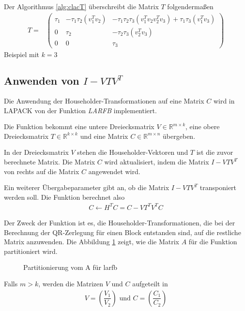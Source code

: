 Der Algorithmus \ref{alg:clacT} überschreibt die Matrix $T$ folgendermaßen
\begin{align*}
T =&
\begin{pmatrix}
\tau_1 & -\tau_1 \tau_2 (v_1^T v_2 ) & - \tau_1 \tau_2  \tau_3 (v_1^T v_2 v_2^T v_3) + \tau_1 \tau_3  (v_1^T v_3)\\ 
0 & \tau_2 &  -\tau_2 \tau_3  (v_2^T v_3)\\
0 & 0 & \tau_3
\end{pmatrix}
\end{align*}
Beispiel mit $k=3$

\subsection{Anwenden von $I - VTV^T$} \label{applyT}
Die Anwendung der Householder-Transformationen auf eine Matrix $C$ wird in LAPACK von der  Funktion \textit{LARFB} implementiert.

Die Funktion bekommt eine untere Dreiecksmatrix $V \in \mathbb{R}^{m \times k}$, eine obere Dreiecksmatrix $T \in \mathbb{R}^{k \times k}$ und eine Matrix $C \in \mathbb{R}^{m \times n }$ übergeben.

In der Dreiecksmatrix $V$ stehen die Householder-Vektoren und $T$ ist die zuvor berechnete Matrix.
Die Matrix $C$ wird aktualisiert, indem die Matrix $I - V T V^T $ von rechts auf die Matrix $ C $ angewendet wird. 

Ein weiterer Übergabeparameter gibt an, ob die Matrix  $I - V T V^T $ transponiert werden soll.
Die Funktion berechnet also
\begin{align}
	C \leftarrow H^T C = C - V T^T V^T C	\label{eq:larfb}
\end{align}

Der Zweck der Funktion ist es, die Householder-Transformationen, die bei der Berechnung der QR-Zerlegung für einen Block entstanden sind, auf die restliche Matrix anzuwenden.
Die Abbildung \ref{fig:patrA} zeigt, wie die Matrix $A$ für die Funktion partitioniert wird.
\begin{figure} [H]
	\centering
	
	\caption{Partitionierung vom A für larfb}
	\label{fig:patrA}
\end{figure}
Falls $m > k $, werden die Matrizen $V$ und $C$ aufgeteilt in
\begin{align}
	V=\left(\dfrac{V_1}{V_2}\right)  \text{  und  } C=\left(\dfrac{C_1}{C_2}\right)
	\label{eq:aufteilen}
\end{align}

